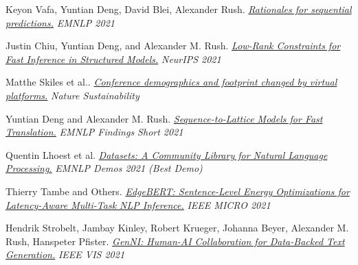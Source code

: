 \documentclass[11pt]{article}
\begin{document}
\ind Keyon Vafa, Yuntian Deng, David Blei, Alexander Rush. \emph{\href{ https://arxiv.org/pdf/2109.06387 }{ Rationales for sequential predictions.} }\emph{ EMNLP 2021 }

\medskip



\ind Justin Chiu, Yuntian Deng, and Alexander M. Rush. \emph{\href{ https://proceedings.neurips.cc/paper/2021/file/16c0d78ef6a76b5c247113a4c9514059-Paper.pdf }{ Low-Rank Constraints for Fast Inference in Structured Models.} }\emph{ NeurIPS 2021 }

\medskip



\ind Matthe Skiles et al.. \emph{\href{ https://www.nature.com/articles/s41893-021-00823-2 }{ Conference demographics and footprint changed by virtual platforms.} }\emph{ Nature Sustainability }

\medskip



\ind Yuntian Deng and Alexander M. Rush. \emph{\href{ https://aclanthology.org/2021.findings-emnlp.318.pdf }{ Sequence-to-Lattice Models for Fast Translation.} }\emph{ EMNLP Findings Short 2021 }

\medskip



\ind Quentin Lhoest et al. \emph{\href{ https://arxiv.org/pdf/2109.02846.pdf }{ Datasets: A Community Library for Natural Language Processing.} }\emph{ EMNLP Demos 2021 (Best Demo) }

\medskip



\ind Thierry Tambe and Others. \emph{\href{ https://arxiv.org/pdf/2011.14203.pdf }{ EdgeBERT: Sentence-Level Energy Optimizations for Latency-Aware Multi-Task NLP Inference.} }\emph{ IEEE MICRO 2021 }

\medskip



\ind Hendrik Strobelt, Jambay Kinley, Robert Krueger, Johanna Beyer, Alexander M. Rush, Hanspeter Pfister. \emph{\href{ None }{ GenNI: Human-AI Collaboration for Data-Backed Text Generation.} }\emph{ IEEE VIS 2021 }
\end{document}
